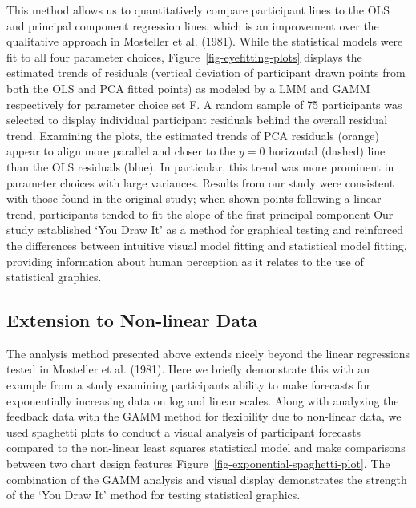 \documentclass[
]{jds}
\begin{document}
This method allows us to quantitatively compare participant lines to the
OLS and principal component regression lines, which is an improvement
over the qualitative approach in Mosteller et al. (1981). While the
statistical models were fit to all four parameter choices,
Figure~\ref{fig-eyefitting-plots} displays the estimated trends of
residuals (vertical deviation of participant drawn points from both the
OLS and PCA fitted points) as modeled by a LMM and GAMM respectively for
parameter choice set F. A random sample of 75 participants was selected
to display individual participant residuals behind the overall residual
trend. Examining the plots, the estimated trends of PCA residuals
(orange) appear to align more parallel and closer to the \(y=0\)
horizontal (dashed) line than the OLS residuals (blue). In particular,
this trend was more prominent in parameter choices with large variances.
Results from our study were consistent with those found in the original
study; when shown points following a linear trend, participants tended
to fit the slope of the first principal component Our study established
`You Draw It' as a method for graphical testing and reinforced the
differences between intuitive visual model fitting and statistical model
fitting, providing information about human perception as it relates to
the use of statistical graphics.

\hypertarget{extension-to-non-linear-data}{%
\subsection{Extension to Non-linear
Data}\label{extension-to-non-linear-data}}

The analysis method presented above extends nicely beyond the linear
regressions tested in Mosteller et al. (1981). Here we briefly
demonstrate this with an example from a study examining participants
ability to make forecasts for exponentially increasing data on log and
linear scales. Along with analyzing the feedback data with the GAMM
method for flexibility due to non-linear data, we used spaghetti plots
to conduct a visual analysis of participant forecasts compared to the
non-linear least squares statistical model and make comparisons between
two chart design features Figure~\ref{fig-exponential-spaghetti-plot}.
The combination of the GAMM analysis and visual display demonstrates the
strength of the `You Draw It' method for testing statistical graphics.
\end{document}
